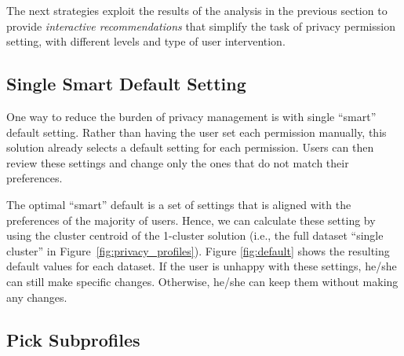 The next strategies exploit the results of the analysis in the previous section to provide \textit{interactive recommendations} that simplify the task of privacy permission setting, with different levels and type of user intervention.

\subsection{Single Smart Default Setting}


One way to reduce the burden of privacy management is with single ``smart'' default setting. Rather than having the user set each permission manually, this solution already selects a default setting for each permission. Users can then review these settings and change only the ones that do not match their preferences.

The optimal ``smart'' default is a set of settings that is aligned with the preferences of the majority of users. Hence, we can calculate these setting by using the cluster centroid of the 1-cluster solution (i.e., the full dataset ``single cluster'' in Figure~\ref{fig:privacy_profiles}). Figure \ref{fig:default} shows the resulting default values for each dataset. If the user is unhappy with these settings, he/she can still make specific changes. Otherwise, he/she can keep them without making any changes. 

%	


\subsection{Pick Subprofiles}

